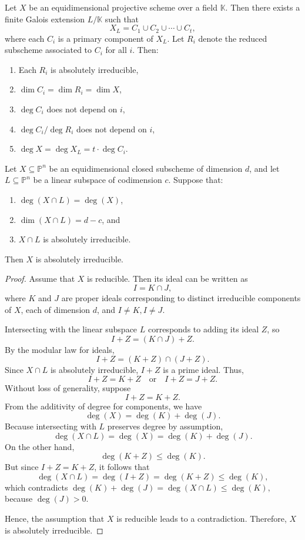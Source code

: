 \documentclass{amsart}
\begin{document}
\begin{lemma}\textnormal{\cite[Tag 054R]{stacks-project}}\label{lemma:galextension-primarycomp}
Let \( X \) be an equidimensional projective scheme over a field \( \mathbb{K} \). Then there exists a finite Galois extension \( L/\mathbb{K} \) such that
\[
X_L = C_1 \cup C_2 \cup \cdots \cup C_t,
\]
where each \( C_i \) is a primary component of \( X_L \). Let \( R_i \) denote the reduced subscheme associated to \( C_i \) for all \( i \). Then:
\begin{enumerate}
    \item Each \( R_i \) is absolutely irreducible,
    \item \( \dim C_i = \dim R_i = \dim X \),
    \item \( \deg C_i \) does not depend on \( i \),
    \item \( {\deg C_i}/{\deg R_i} \) does not depend on \( i \),
    \item \( \deg X = \deg X_L = t \cdot \deg C_i. \)
\end{enumerate}
\end{lemma}


\begin{lemma}\label{equidim-absolirred}
Let \( X \subseteq \mathbb{P}^n \) be an equidimensional closed subscheme of dimension \( d \), and let \( L \subseteq \mathbb{P}^n \) be a linear subspace of codimension \( c \). Suppose that:
\begin{enumerate}
  \item \( \deg(X \cap L) = \deg(X) \),
  \item \( \dim(X \cap L) = d - c \), and
  \item \( X \cap L \) is absolutely irreducible.
\end{enumerate}
Then \( X \) is absolutely irreducible.
\end{lemma}

\begin{proof}
Assume that \(X\) is reducible. Then its ideal can be written as
\[
I = K \cap J,
\]
where \(K\) and \(J\) are proper ideals corresponding to distinct irreducible components of \(X\), each of dimension \(d\), and \(I \neq K, I \neq J\).

Intersecting with the linear subspace \(L\) corresponds to adding its ideal \(Z\), so
\[
I + Z = (K \cap J) + Z.
\]
By the modular law for ideals,
\[
I + Z = (K + Z) \cap (J + Z).
\]
Since \(X \cap L\) is absolutely irreducible, \(I + Z\) is a prime ideal. Thus,
\[
I + Z = K + Z \quad \text{or} \quad I + Z = J + Z.
\]
Without loss of generality, suppose
\[
I + Z = K + Z.
\]
From the additivity of degree for components, we have
\[
\deg(X) = \deg(K) + \deg(J).
\]
Because intersecting with \(L\) preserves degree by assumption,
\[
\deg(X \cap L) = \deg(X) = \deg(K) + \deg(J).
\]
On the other hand, 
\[
\deg(K + Z) \leq \deg(K).
\]
But since \(I + Z = K + Z\), it follows that
\[
\deg(X \cap L) = \deg(I + Z) = \deg(K + Z) \leq \deg(K),
\]
which contradicts $\deg(K) + \deg(J) = \deg(X \cap L) \leq \deg(K),$
because \(\deg(J) > 0\).

Hence, the assumption that \(X\) is reducible leads to a contradiction. Therefore, \(X\) is absolutely irreducible.
\end{proof}
\end{document}
